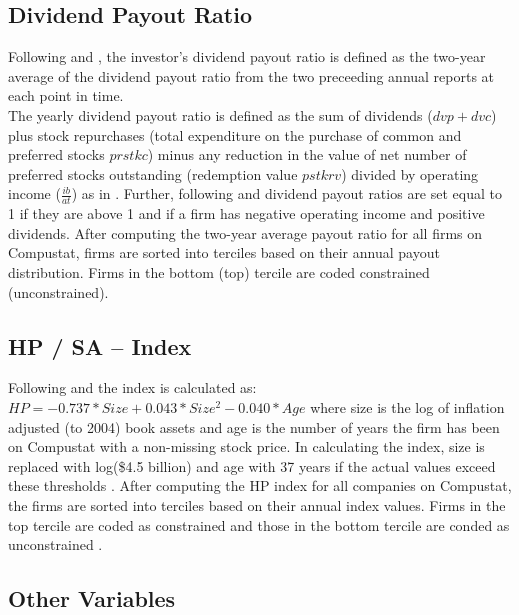 \documentclass[12pt]{article}
\begin{document}
\begin{appendices}
	\subsection*{Dividend Payout Ratio}
	\noindent Following \citet[p.119]{Khatami2014} and \citet[p.1789]{Almeida2004}, the investor's dividend payout ratio is defined as the two-year average of the dividend payout ratio from the two preceeding annual reports at each point in time.\\
	The yearly dividend payout ratio is defined as the sum of dividends ($dvp+dvc$) plus stock repurchases (total expenditure on the purchase of common and preferred stocks $prstkc$) minus any reduction in the value of net number of preferred stocks outstanding (redemption value $pstkrv$) divided by operating income ($\frac{ib}{at}$) as in \citet[p.369]{Jagannathan2000}. Further, following \citet[p.119]{Khatami2014} and \citet[p.1923]{hadlock2010} dividend payout ratios are set equal to 1 if they are above 1 and if a firm has negative operating income and positive dividends. After computing the two-year average payout ratio for all firms on Compustat, firms are sorted into terciles based on their annual payout distribution. Firms in the bottom (top) tercile are coded constrained (unconstrained). 

	\subsection*{HP / SA -- Index}
	\noindent Following \citet[p.1929]{hadlock2010} and \citet[p.119]{Khatami2014} the index is calculated as: $HP=-0.737*Size+0.043*Size^{2}-0.040*Age$ where size is the log of inflation adjusted (to 2004) book assets and age is the number of years the firm has been on Compustat with a non-missing stock price. In calculating the index, size is replaced with log(\$4.5 billion) and age with 37 years if the actual values exceed these thresholds \citep[p.1929]{hadlock2010}. After computing the HP index for all companies on Compustat, the firms are sorted into terciles based on their annual index values. Firms in the top tercile are coded as constrained and those in the bottom tercile are conded as unconstrained \citep[p.38]{Farre-mensa2013}.
	\pagebreak

	\subsection*{Other Variables}


\end{appendices}
\end{document}
